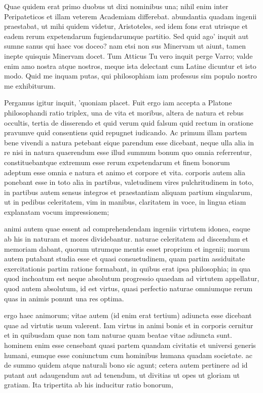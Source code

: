  Quae quidem erat primo duobus ut dixi nominibus una; nihil enim inter Peripateticos et illam veterem Academiam differebat. abundantia quadam ingenii praestabat, ut mihi quidem videtur, Aristoteles, sed idem fons erat utrisque et eadem rerum expetendarum fugiendarumque partitio. Sed quid ago' inquit aut sumne sanus qui haec vos doceo? nam etsi non sus Minervam ut aiunt, tamen inepte quisquis Minervam docet. Tum Atticus Tu vero inquit perge Varro; valde enim amo nostra atque nostros, meque ista delectant cum Latine dicuntur et isto modo. Quid me inquam putas, qui philosophiam iam professus sim populo nostro me exhibiturum.

 Pergamus igitur inquit, 'quoniam placet. Fuit ergo iam accepta a Platone philosophandi ratio triplex, una de vita et moribus, altera de natura et rebus occultis, tertia de disserendo et quid verum quid falsum quid rectum in oratione pravumve quid consentiens quid repugnet iudicando. Ac primum illam partem bene vivendi a natura petebant eique parendum esse dicebant, neque ulla alia in re nisi in natura quaerendum esse illud summum bonum quo omnia referrentur, constituebantque extremum esse rerum expetendarum et finem bonorum adeptum esse omnia e natura et animo et corpore et vita. corporis autem alia ponebant esse in toto alia in partibus, valetudinem vires pulchritudinem in toto, in partibus autem sensus integros et praestantiam aliquam partium singularum, ut in pedibus celeritatem, vim in manibus, claritatem in voce, in lingua etiam explanatam vocum impressionem;

 animi autem quae essent ad comprehendendam ingeniis virtutem idonea, eaque ab his in naturam et mores dividebantur. naturae celeritatem ad discendum et memoriam dabant, quorum utrumque mentis esset proprium et ingenii; morum autem putabant studia esse et quasi consuetudinem, quam partim assiduitate exercitationis partim ratione formabant, in quibus erat ipsa philosophia; in qua quod inchoatum est neque absolutum progressio quaedam ad virtutem appellatur, quod autem absolutum, id est virtus, quasi perfectio naturae omniumque rerum quas in animis ponunt una res optima.

 ergo haec animorum; vitae autem (id enim erat tertium) adiuncta esse dicebant quae ad virtutis usum valerent. Iam virtus in animi bonis et in corporis cernitur et in quibusdam quae non tam naturae quam beatae vitae adiuncta sunt. hominem enim esse censebant quasi partem quandam civitatis et universi generis humani, eumque esse coniunctum cum hominibus humana quadam societate. ac de summo quidem atque naturali bono sic agunt; cetera autem pertinere ad id putant aut adaugendum aut ad tenendum, ut divitias ut opes ut gloriam ut gratiam. Ita tripertita ab his inducitur ratio bonorum,

